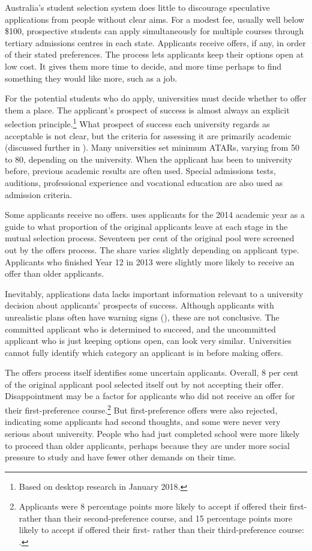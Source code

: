 Australia's student selection system does little to discourage speculative applications from people without clear aims. For a modest fee, usually well below \$100, prospective students can apply simultaneously for multiple courses through tertiary admissions centres in each state. Applicants receive offers, if any, in order of their stated preferences. The process lets applicants keep their options open at low cost. It gives them more time to decide, and more time perhaps to find something they would like more, such as a job.

For the potential students who do apply, universities must decide whether to offer them a place. The applicant's prospect of success is almost always an explicit selection principle.\footnote{Based on desktop research in January 2018.} What prospect of success each university regards as acceptable is not clear, but the criteria for assessing it are primarily academic (discussed further in ). Many universities set minimum ATARs, varying from 50 to 80, depending on the university. When the applicant has been to university before, previous academic results are often used. Special admissions tests, auditions, professional experience and vocational education are also used as admission criteria.

Some applicants receive no offers.  uses applicants for the 2014 academic year as a guide to what proportion of the original applicants leave at each stage in the mutual selection process. Seventeen per cent of the original pool were screened out by the offers process. The share varies slightly depending on applicant type. Applicants who finished Year 12 in 2013 were slightly more likely to receive an offer than older applicants.

Inevitably, applications data lacks important information relevant to a university decision about applicants' prospects of success. Although applicants with unrealistic plans often have warning signs (), these are not conclusive. The committed applicant who is determined to succeed, and the uncommitted applicant who is just keeping options open, can look very similar. Universities cannot fully identify which category an applicant is in before making offers.

The offers process itself identifies some uncertain applicants. Overall, 8 per cent of the original applicant pool selected itself out by not accepting their offer. Disappointment may be a factor for applicants who did not receive an offer for their first-preference course.\footnote{Applicants were 8 percentage points more likely to accept if offered their first- rather than their second-preference course, and 15 percentage points more likely to accept if offered their first- rather than their third-preference course: \textcite[][]{DepartmentofEducationandTraining2017n}.} But first-preference offers were also rejected, indicating some applicants had second thoughts, and some were never very serious about university. People who had just completed school were more likely to proceed than older applicants, perhaps because they are under more social pressure to study and have fewer other demands on their time.

